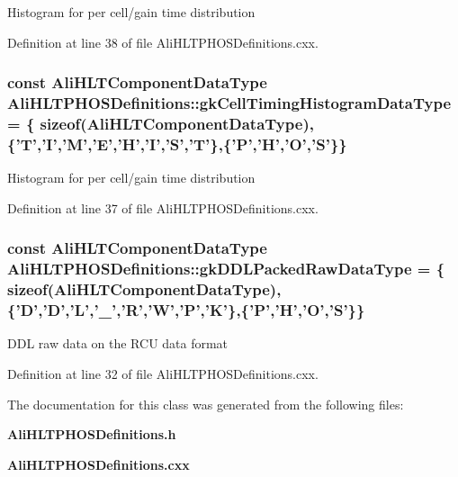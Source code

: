 Histogram for per cell/gain time distribution 

Definition at line 38 of file Ali\-HLTPHOSDefinitions.cxx.
\subsubsection{\setlength{\rightskip}{0pt plus 5cm}const {\bf Ali\-HLTComponent\-Data\-Type} {\bf Ali\-HLTPHOSDefinitions::gk\-Cell\-Timing\-Histogram\-Data\-Type} = \{ sizeof({\bf Ali\-HLTComponent\-Data\-Type}), \{'T','I','M','E','H','I','S','T'\},\{'P','H','O','S'\}\}\hspace{0.3cm}{\tt  [static]}}\label{classAliHLTPHOSDefinitions_s5}


Histogram for per cell/gain time distribution 

Definition at line 37 of file Ali\-HLTPHOSDefinitions.cxx.
\subsubsection{\setlength{\rightskip}{0pt plus 5cm}const {\bf Ali\-HLTComponent\-Data\-Type} {\bf Ali\-HLTPHOSDefinitions::gk\-DDLPacked\-Raw\-Data\-Type} = \{ sizeof({\bf Ali\-HLTComponent\-Data\-Type}), \{'D','D','L','\_\-','R','W','P','K'\},\{'P','H','O','S'\}\}\hspace{0.3cm}{\tt  [static]}}\label{classAliHLTPHOSDefinitions_s1}


DDL raw data on the RCU data format 

Definition at line 32 of file Ali\-HLTPHOSDefinitions.cxx.

The documentation for this class was generated from the following files:\begin{CompactItemize}
\item 
{\bf Ali\-HLTPHOSDefinitions.h}\item 
{\bf Ali\-HLTPHOSDefinitions.cxx}\end{CompactItemize}
